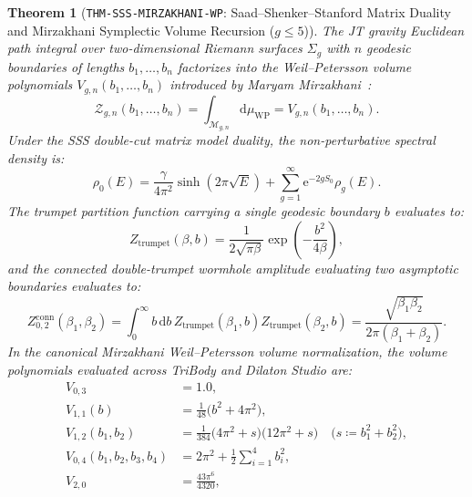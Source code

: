 \documentclass[11pt,a4paper,reqno]{article}
\theoremstyle{plain}
\newtheorem{theorem}{Theorem}[section]
\theoremstyle{definition}
\theoremstyle{remark}
\numberwithin{equation}{section}
\providecommand{\diff}{\mathrm{d}}
\begin{document}
\begin{theorem}[\texttt{THM-SSS-MIRZAKHANI-WP}: Saad--Shenker--Stanford Matrix Duality and Mirzakhani Symplectic Volume Recursion ($g \le 5$)]
\label{thm:sss_mirzakhani_wp}
The JT gravity Euclidean path integral over two-dimensional Riemann surfaces $\Sigma_g$ with $n$ geodesic boundaries of lengths $b_1, \dots, b_n$ factorizes into the Weil--Petersson volume polynomials $V_{g,n}(b_1, \dots, b_n)$ introduced by Maryam Mirzakhani~\cite{Mirzakhani2007}:
\begin{equation}
  \mathcal{Z}_{g,n}(b_1, \dots, b_n) = \int_{\mathcal{M}_{g,n}} \diff \mu_{\mathrm{WP}} = V_{g,n}(b_1, \dots, b_n).
  \label{eq:weil_petersson_integral}
\end{equation}
Under the SSS double-cut matrix model duality, the non-perturbative spectral density is:
\begin{equation}
  \rho_0(E) = \frac{\gamma}{4\pi^2} \sinh(2\pi \sqrt{E}) + \sum_{g=1}^\infty \mathrm{e}^{-2g S_0} \rho_g(E).
  \label{eq:sss_spectral_density}
\end{equation}
The trumpet partition function carrying a single geodesic boundary $b$ evaluates to:
\begin{equation}
  Z_{\mathrm{trumpet}}(\beta, b) = \frac{1}{2\sqrt{\pi \beta}} \exp\left( -\frac{b^2}{4\beta} \right),
  \label{eq:trumpet_partition}
\end{equation}
and the connected double-trumpet wormhole amplitude evaluating two asymptotic boundaries evaluates to:
\begin{equation}
  Z_{0,2}^{\mathrm{conn}}(\beta_1, \beta_2) = \int_0^\infty b \, \diff b \, Z_{\mathrm{trumpet}}(\beta_1, b) Z_{\mathrm{trumpet}}(\beta_2, b) = \frac{\sqrt{\beta_1 \beta_2}}{2\pi(\beta_1 + \beta_2)}.
  \label{eq:double_trumpet_wormhole}
\end{equation}
In the canonical Mirzakhani Weil--Petersson volume normalization, the volume polynomials evaluated across TriBody and Dilaton Studio are:
\begin{align}
  V_{0,3} &= 1.0, \nonumber \\
  V_{1,1}(b) &= \frac{1}{48} \big( b^2 + 4\pi^2 \big), \nonumber \\
  V_{1,2}(b_1, b_2) &= \frac{1}{384} \big( 4\pi^2 + s \big) \big( 12\pi^2 + s \big) \quad \big(s \coloneqq b_1^2 + b_2^2\big), \nonumber \\
  V_{0,4}(b_1, b_2, b_3, b_4) &= 2\pi^2 + \frac{1}{2} \sum_{i=1}^4 b_i^2, \nonumber \\
  V_{2,0} &= \frac{43 \pi^6}{4320}, \nonumber \\

\end{align}
\end{theorem}
\end{document}
